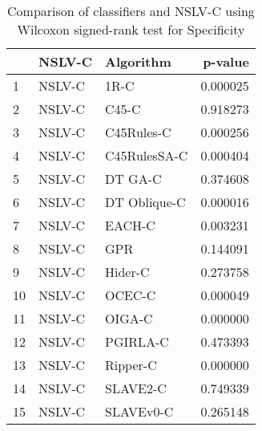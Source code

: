 \begin{table}
\footnotesize
\caption{Comparison of classifiers and NSLV-C using Wilcoxon signed-rank test for Specificity}
\label{tab:NSLV-C wilcoxon Specificity comparison}
\begin{tabular}{lllr}
\hline
 & NSLV-C & Algorithm & p-value \\
\hline
1 & NSLV-C & 1R-C & 0.000025 \\
2 & NSLV-C & C45-C & 0.918273 \\
3 & NSLV-C & C45Rules-C & 0.000256 \\
4 & NSLV-C & C45RulesSA-C & 0.000404 \\
5 & NSLV-C & DT GA-C & 0.374608 \\
6 & NSLV-C & DT Oblique-C & 0.000016 \\
7 & NSLV-C & EACH-C & 0.003231 \\
8 & NSLV-C & GPR & 0.144091 \\
9 & NSLV-C & Hider-C & 0.273758 \\
10 & NSLV-C & OCEC-C & 0.000049 \\
11 & NSLV-C & OIGA-C & 0.000000 \\
12 & NSLV-C & PGIRLA-C & 0.473393 \\
13 & NSLV-C & Ripper-C & 0.000000 \\
14 & NSLV-C & SLAVE2-C & 0.749339 \\
15 & NSLV-C & SLAVEv0-C & 0.265148 \\
\hline
\end{tabular}
\end{table}
